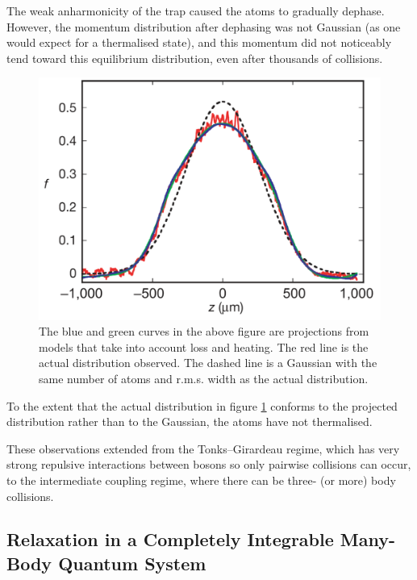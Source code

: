 \documentclass[a4paper, 10pt]{article}
\theoremstyle{plain}
\begin{document}
The weak anharmonicity of the trap caused the atoms to gradually dephase.
However, the momentum distribution after dephasing was not Gaussian (as one
would expect for a thermalised state), and this momentum did not noticeably
tend toward this equilibrium distribution, even after thousands of collisions.
\begin{figure}[H]
    \begin{center}
    \includegraphics[width=1.0\textwidth]{dephased_momentum_distribution}
    \end{center}
    \caption{\label{dephased_momentum_distribution}
             The blue and green curves in the above figure are projections from
             models that take into account loss and heating. The red line is the
             actual distribution observed. The dashed line is a Gaussian with
             the same number of atoms and r.m.s. width as the actual
             distribution.}
\end{figure}
To the extent that the actual distribution in figure
\ref{dephased_momentum_distribution} conforms to the projected distribution
rather than to the Gaussian, the atoms have not thermalised.

These observations extended from the Tonks--Girardeau regime, which has very
strong repulsive interactions between bosons so only pairwise collisions can
occur, to the intermediate coupling regime, where there can be three-
(or more) body collisions.

\subsection{Relaxation in a Completely Integrable Many-Body Quantum System}
\end{document}
